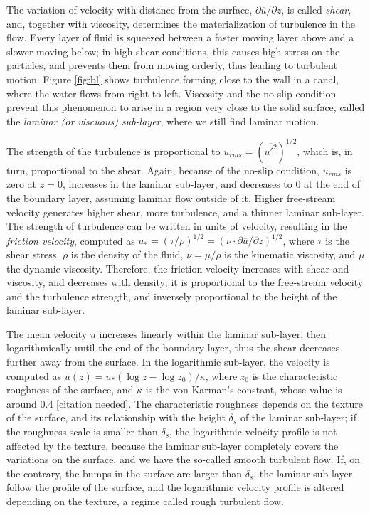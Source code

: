 \documentclass[12pt]{book}
\begin{document}
The variation of velocity with distance from the surface, $\partial\overline{u}/\partial z$, is called \emph{shear}, and, together with viscosity, determines the materialization of turbulence in the flow. Every layer of fluid is squeezed between a faster moving layer above and a slower moving below; in high shear conditions, this causes high stress on the particles, and prevents them from moving orderly, thus leading to turbulent motion. Figure \ref{fig:bl} shows turbulence forming close to the wall in a canal, where the water flows from right to left. Viscosity and the no-slip condition prevent this phenomenon to arise in a region very close to the solid surface, called the \emph{laminar (or viscuous) sub-layer}, where we still find laminar motion.

The strength of the turbulence is proportional to $u_{rms}=(\overline{u'^2})^{1/2}$, which is, in turn, proportional to the shear. Again, because of the no-slip condition, $u_{rms}$ is zero at $z=0$, increases in the laminar sub-layer, and decreases to 0 at the end of the boundary layer, assuming laminar flow outside of it. Higher free-stream velocity generates higher shear, more turbulence, and a thinner laminar sub-layer. The strength of turbulence can be written in units of velocity, resulting in the \emph{friction velocity}, computed as $u_*=(\tau/\rho)^{1/2}=(\nu\cdot\partial\overline{u}/\partial z)^{1/2}$, where $\tau$ is the shear stress, $\rho$ is the density of the fluid, $\nu=\mu/\rho$ is the kinematic viscosity, and $\mu$ the dynamic viscosity. Therefore, the friction velocity increases with shear and viscosity, and decreases with density; it is proportional to the free-stream velocity and the turbulence strength, and inversely proportional to the height of the laminar sub-layer.

The mean velocity $\overline{u}$ increases linearly within the laminar sub-layer, then logarithmically until the end of the boundary layer, thus the shear decreases further away from the surface. In the logarithmic sub-layer, the velocity is computed as $\overline{u}(z)=u_*(\log z - \log z_0)/\kappa$, where $z_0$ is the characteristic roughness of the surface, and $\kappa$ is the von Karman's constant, whose value is around 0.4 [citation needed]. The characteristic roughness depends on the texture of the surface, and its relationship with the height $\delta_s$ of the laminar sub-layer; if the roughness scale is smaller than $\delta_s$, the logarithmic velocity profile is not affected by the texture, because the laminar sub-layer completely covers the variations on the surface, and we have the so-called smooth turbulent flow. If, on the contrary, the bumps in the surface are larger than $\delta_s$, the laminar sub-layer follow the profile of the surface, and the logarithmic velocity profile is altered depending on the texture, a regime called rough turbulent flow.
\end{document}
